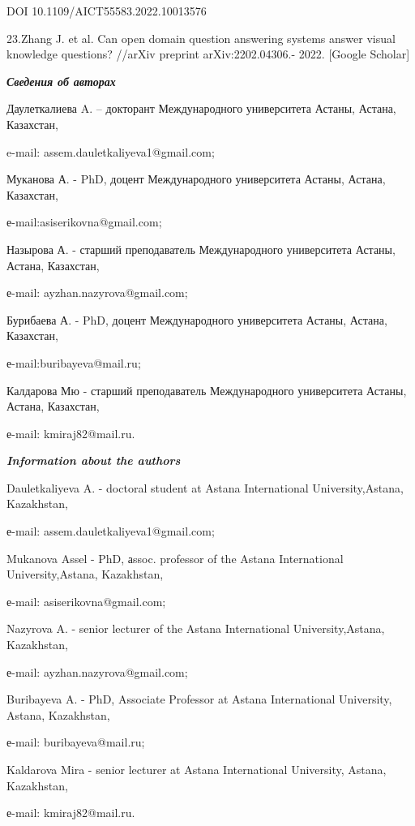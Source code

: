 DOI 10.1109/AICT55583.2022.10013576

23.Zhang J. et al. Can open domain question answering systems answer
visual knowledge questions? //arXiv preprint arXiv:2202.04306.- 2022.
{[}Google Scholar{]}

\emph{\textbf{Сведения об авторах}}

Даулеткалиева A. -- докторант Международного университета Астаны,
Астана, Казахстан,

e-mail: assem.dauletkaliyeva1@gmail.com;

Муканова А. - PhD, доцент Международного университета Астаны, Астана,
Казахстан,

е-mail:asiserikovna@gmail.com;

Назырова А. - старший преподаватель Международного университета Астаны,
Астана, Казахстан,

е-mail: ayzhan.nazyrova@gmail.com;

Бурибаева А. - PhD, доцент Международного университета Астаны, Астана,
Казахстан,

е-mail:buribayeva@mail.ru;

Калдарова Мю - старший преподаватель Международного университета Астаны,
Астана, Казахстан,

е-mail: kmiraj82@mail.ru.

\emph{\textbf{Information about the authors}}

Dauletkaliyeva A. - doctoral student at Astana International
University,Astana, Kazakhstan,

е-mail: assem.dauletkaliyeva1@gmail.com;

Mukanova Assel - PhD, аssoc. professor of the Astana International
University,Astana, Kazakhstan,

е-mail: asiserikovna@gmail.com;

Nazyrova A. - senior lecturer of the Astana International
University,Astana, Kazakhstan,

е-mail: ayzhan.nazyrova@gmail.com;

Buribayeva A. - PhD, Associate Professor at Astana International
University, Astana, Kazakhstan,

е-mail: buribayeva@mail.ru;

Kaldarova Mira - senior lecturer at Astana International University,
Astana, Kazakhstan,

е-mail: kmiraj82@mail.ru.
